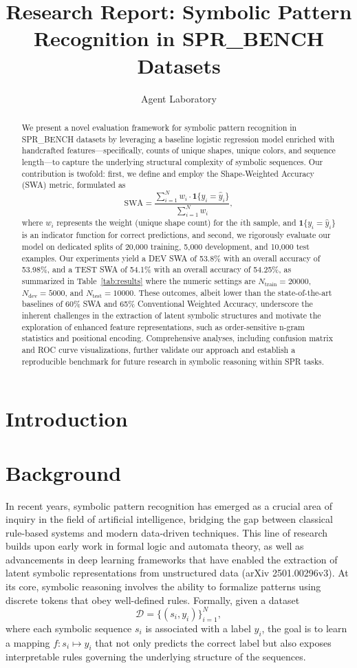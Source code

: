 \documentclass{article}
\title{Research Report: Symbolic Pattern Recognition in SPR\_BENCH Datasets}
\author{Agent Laboratory}
\date{}
\begin{document}
\maketitle

\begin{abstract}
We present a novel evaluation framework for symbolic pattern recognition in SPR\_BENCH datasets by leveraging a baseline logistic regression model enriched with handcrafted features—specifically, counts of unique shapes, unique colors, and sequence length—to capture the underlying structural complexity of symbolic sequences. Our contribution is twofold: first, we define and employ the Shape-Weighted Accuracy (SWA) metric, formulated as $$\text{SWA}=\frac{\sum_{i=1}^{N}w_i\cdot\mathbf{1}\{y_i=\hat{y}_i\}}{\sum_{i=1}^{N}w_i},$$ where $w_i$ represents the weight (unique shape count) for the $i$th sample, and $\mathbf{1}\{y_i=\hat{y}_i\}$ is an indicator function for correct predictions, and second, we rigorously evaluate our model on dedicated splits of 20,000 training, 5,000 development, and 10,000 test examples. Our experiments yield a DEV SWA of 53.8\% with an overall accuracy of 53.98\%, and a TEST SWA of 54.1\% with an overall accuracy of 54.25\%, as summarized in Table~\ref{tab:results} where the numeric settings are $N_{\text{train}}=20000$, $N_{\text{dev}}=5000$, and $N_{\text{test}}=10000$. These outcomes, albeit lower than the state-of-the-art baselines of 60\% SWA and 65\% Conventional Weighted Accuracy, underscore the inherent challenges in the extraction of latent symbolic structures and motivate the exploration of enhanced feature representations, such as order-sensitive n-gram statistics and positional encoding. Comprehensive analyses, including confusion matrix and ROC curve visualizations, further validate our approach and establish a reproducible benchmark for future research in symbolic reasoning within SPR tasks.
\end{abstract}

\section{Introduction}


\section{Background}
In recent years, symbolic pattern recognition has emerged as a crucial area of inquiry in the field of artificial intelligence, bridging the gap between classical rule-based systems and modern data-driven techniques. This line of research builds upon early work in formal logic and automata theory, as well as advancements in deep learning frameworks that have enabled the extraction of latent symbolic representations from unstructured data (arXiv 2501.00296v3). At its core, symbolic reasoning involves the ability to formalize patterns using discrete tokens that obey well-defined rules. Formally, given a dataset 
\[
\mathcal{D} = \{(s_i, y_i)\}_{i=1}^{N},
\]
where each symbolic sequence \(s_i\) is associated with a label \(y_i\), the goal is to learn a mapping \(f: s_i \mapsto y_i\) that not only predicts the correct label but also exposes interpretable rules governing the underlying structure of the sequences.
\end{document}
